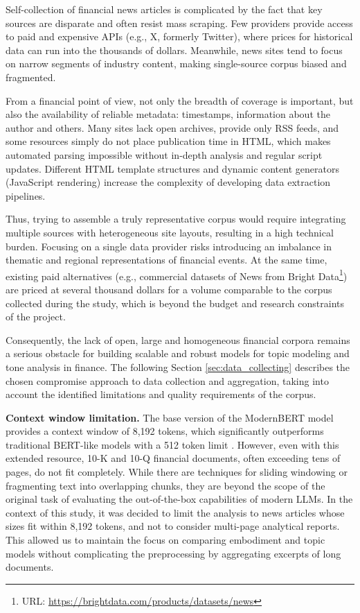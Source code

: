 Self-collection of financial news articles is complicated by the fact that key sources are disparate and often
resist mass scraping. Few providers provide access to paid and expensive APIs (e.g., X, formerly Twitter),
where prices for historical data can run into the thousands of dollars. Meanwhile, news sites tend to focus
on narrow segments of industry content, making single-source corpus biased and fragmented.

From a financial point of view, not only the breadth of coverage is important, but also the availability
of reliable metadata: timestamps, information about the author and others. Many sites lack open archives,
provide only RSS feeds, and some resources simply do not place publication time in HTML, which makes automated
parsing impossible without in-depth analysis and regular script updates. Different HTML template structures
and dynamic content generators (JavaScript rendering) increase the complexity of developing data extraction
pipelines.

Thus, trying to assemble a truly representative corpus would require integrating multiple sources
with heterogeneous site layouts, resulting in a high technical burden. Focusing on a single data provider
risks introducing an imbalance in thematic and regional representations of financial events. At the same
time, existing paid alternatives (e.g., commercial datasets of News from Bright
Data\footnote{URL: \url{https://brightdata.com/products/datasets/news}}) are priced at several thousand
dollars for a volume comparable to the corpus collected during the study, which is beyond the budget
and research constraints of the project.

Consequently, the lack of open, large and homogeneous financial corpora remains a serious obstacle for building
scalable and robust models for topic modeling and tone analysis in finance. The following Section \ref{sec:data_collecting}
describes the chosen compromise approach to data collection and aggregation, taking into account the identified
limitations and quality requirements of the corpus.

\textbf{Context window limitation.} The base version of the ModernBERT model provides a context window of 8,192 tokens,
which significantly outperforms traditional BERT-like models with a 512 token limit \parencite{devlin2019BERT,Warner2024ModernBERT}. However,
even with this extended resource, 10-K and 10-Q financial documents, often exceeding tens of pages, do not fit
completely. While there are techniques for sliding windowing or fragmenting text into overlapping chunks, they
are beyond the scope of the original task of evaluating the out-of-the-box capabilities of modern LLMs.
In the context of this study, it was decided to limit the analysis to news articles whose sizes fit within 8,192
tokens, and not to consider multi-page analytical reports. This allowed us to maintain the focus on comparing
embodiment and topic models without complicating the preprocessing by aggregating excerpts of long documents.

